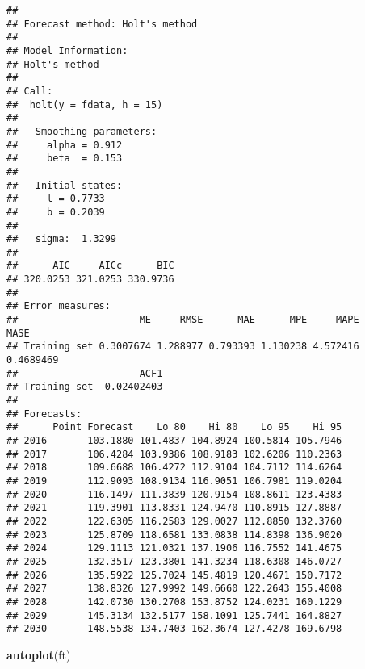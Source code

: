 \documentclass[
]{article}
\newenvironment{Shaded}{\begin{snugshade}}{\end{snugshade}}
\newcommand{\DataTypeTok}[1]{\textcolor[rgb]{0.13,0.29,0.53}{#1}}
\newcommand{\DecValTok}[1]{\textcolor[rgb]{0.00,0.00,0.81}{#1}}
\newcommand{\KeywordTok}[1]{\textcolor[rgb]{0.13,0.29,0.53}{\textbf{#1}}}
\newcommand{\NormalTok}[1]{#1}
\newcommand{\OperatorTok}[1]{\textcolor[rgb]{0.81,0.36,0.00}{\textbf{#1}}}
\newcommand{\StringTok}[1]{\textcolor[rgb]{0.31,0.60,0.02}{#1}}
\begin{document}
\begin{Shaded}
\end{Shaded}

\begin{verbatim}
## 
## Forecast method: Holt's method
## 
## Model Information:
## Holt's method 
## 
## Call:
##  holt(y = fdata, h = 15) 
## 
##   Smoothing parameters:
##     alpha = 0.912 
##     beta  = 0.153 
## 
##   Initial states:
##     l = 0.7733 
##     b = 0.2039 
## 
##   sigma:  1.3299
## 
##      AIC     AICc      BIC 
## 320.0253 321.0253 330.9736 
## 
## Error measures:
##                     ME     RMSE      MAE      MPE     MAPE      MASE
## Training set 0.3007674 1.288977 0.793393 1.130238 4.572416 0.4689469
##                     ACF1
## Training set -0.02402403
## 
## Forecasts:
##      Point Forecast    Lo 80    Hi 80    Lo 95    Hi 95
## 2016       103.1880 101.4837 104.8924 100.5814 105.7946
## 2017       106.4284 103.9386 108.9183 102.6206 110.2363
## 2018       109.6688 106.4272 112.9104 104.7112 114.6264
## 2019       112.9093 108.9134 116.9051 106.7981 119.0204
## 2020       116.1497 111.3839 120.9154 108.8611 123.4383
## 2021       119.3901 113.8331 124.9470 110.8915 127.8887
## 2022       122.6305 116.2583 129.0027 112.8850 132.3760
## 2023       125.8709 118.6581 133.0838 114.8398 136.9020
## 2024       129.1113 121.0321 137.1906 116.7552 141.4675
## 2025       132.3517 123.3801 141.3234 118.6308 146.0727
## 2026       135.5922 125.7024 145.4819 120.4671 150.7172
## 2027       138.8326 127.9992 149.6660 122.2643 155.4008
## 2028       142.0730 130.2708 153.8752 124.0231 160.1229
## 2029       145.3134 132.5177 158.1091 125.7441 164.8827
## 2030       148.5538 134.7403 162.3674 127.4278 169.6798
\end{verbatim}

\begin{Shaded}
\begin{Highlighting}[]
\KeywordTok{autoplot}\NormalTok{(ft)}
\end{Highlighting}
\end{Shaded}
\end{document}
